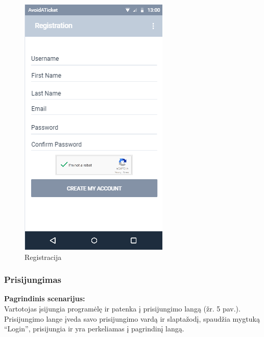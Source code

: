 \documentclass{VUMIFPSkursinis}
\begin{document}
	\begin{figure}[H]
				\centering
				\includegraphics[scale=0.55]{img/mockup_registration}
				\caption{Registracija}
				\label{img:registracija}
			\end{figure}

\subsubsection{Prisijungimas}
	\textbf{Pagrindinis scenarijus:}\\
	Vartotojas įsijungia programėlę ir patenka į prisijungimo langą (žr. 5 pav.). Prisijungimo lange įveda savo prisijungimo vardą ir slaptažodį, 
	spaudžia mygtuką “Login”, prisijungia ir yra perkeliamas į pagrindinį langą.
	
\end{document}
